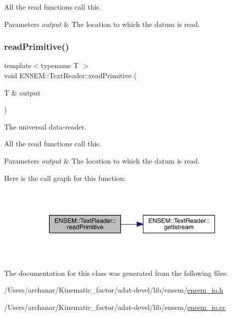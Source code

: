 All the read functions call this. 
\begin{DoxyParams}{Parameters}
{\em output} & The location to which the datum is read. \\
\hline
\end{DoxyParams}
\mbox{\label{classENSEM_1_1TextReader_afa5fccab911c19d1365a51f39df01d96}} 
\subsubsection{\texorpdfstring{readPrimitive()}{readPrimitive()}\hspace{0.1cm}{\footnotesize\ttfamily [3/3]}}
{\footnotesize\ttfamily template$<$typename T $>$ \\
void E\+N\+S\+E\+M\+::\+Text\+Reader\+::read\+Primitive (\begin{DoxyParamCaption}\item[{T \&}]{output }\end{DoxyParamCaption})\hspace{0.3cm}{\ttfamily [protected]}}



The universal data-\/reader. 

All the read functions call this. 
\begin{DoxyParams}{Parameters}
{\em output} & The location to which the datum is read. \\
\hline
\end{DoxyParams}
Here is the call graph for this function\+:
\nopagebreak
\begin{figure}[H]
\begin{center}
\leavevmode
\includegraphics[width=344pt]{d4/d23/classENSEM_1_1TextReader_afa5fccab911c19d1365a51f39df01d96_cgraph}
\end{center}
\end{figure}


The documentation for this class was generated from the following files\+:\begin{DoxyCompactItemize}
\item 
/\+Users/archanar/\+Kinematic\+\_\+factor/adat-\/devel/lib/ensem/\mbox{\hyperlink{adat-devel_2lib_2ensem_2ensem__io_8h}{ensem\+\_\+io.\+h}}\item 
/\+Users/archanar/\+Kinematic\+\_\+factor/adat-\/devel/lib/ensem/\mbox{\hyperlink{adat-devel_2lib_2ensem_2ensem__io_8cc}{ensem\+\_\+io.\+cc}}\end{DoxyCompactItemize}
